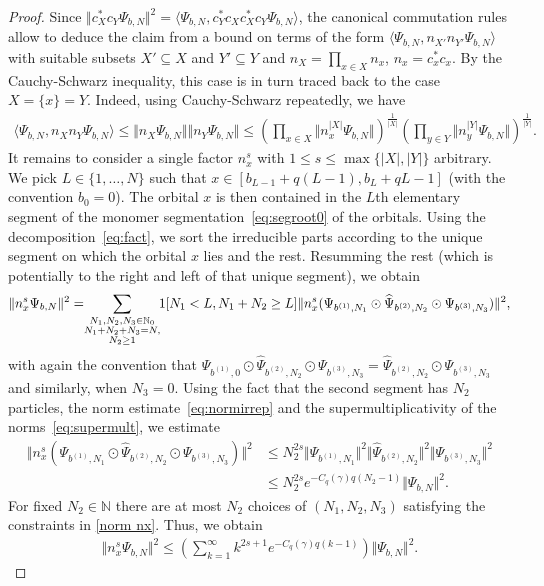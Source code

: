 \documentclass[letterpaper, DIV=17]{scrartcl}
\numberwithin{equation}{section}
\theoremstyle{definition}
\begin{document}
\begin{proof}
	Since $ \Vert c_X^* c_Y \Psi_{b,N} \Vert^2 = \langle    \Psi_{b,N}  , c_Y^* c_X c_X^* c_Y  \Psi_{b,N}  \rangle $, the canonical commutation rules allow to deduce the claim from a bound on terms of the form $  \langle    \Psi_{b,N}  , n_{X'} n_{Y'}  \Psi_{b,N}  \rangle $ with suitable subsets $ X' \subseteq X $ and $ Y' \subseteq Y $ and $ n_X = \prod_{x \in X } n_x $, $ n_x = c_x^* c_x $.
	By the Cauchy-Schwarz inequality,  this case is in turn traced back to the case  $X=\{x\}=Y$.  Indeed, using Cauchy-Schwarz repeatedly, we have 
	\begin{align*}
		 \langle    \Psi_{b,N}  , n_X n_Y  \Psi_{b,N}  \rangle  \leq \Vert n_X \Psi_{b,N}\Vert \Vert n_Y \Psi_{b,N} \Vert
		\leq \left(\prod_{x\in X} \Vert n_x^{\vert X\vert} \Psi_{b,N} \Vert\right)^{\frac{1}{\vert X\vert}} \left(\prod_{y\in Y} \Vert n_y^{\vert Y\vert} \Psi_{b,N} \Vert\right)^{\frac{1}{\vert Y\vert}}. 
	\end{align*}
	It remains to consider a single factor $n_x^s$ with $ 1\leq s \leq \max\{ | X | , |Y| \} $ arbitrary. We pick $L\in \{1, \dots, N\}$ such that $x\in [b_{L-1}+q(L-1), b_L+qL-1]$ (with the convention $b_0=0$). The orbital $x$ is then contained in the $L$th elementary segment of the monomer segmentation~\eqref{eq:segroot0} of the orbitals. Using the decomposition~\eqref{eq:fact}, we sort the irreducible parts  according to the unique segment on which the orbital $x$  lies and the rest. Resumming the rest (which is potentially to the right and left of that unique segment),  we obtain
	\begin{equation} \label{norm nx}
		\Vert n_x^s \Psi_{b,N} \Vert^2
		= \mkern-5mu \sum_{\substack{N_1, N_2, N_3\in \mathbb{N}_0\\ N_1+N_2+N_3=N, \\ N_2\geq 1}} \mkern-5mu 1[N_1<L, N_1+N_2\geq L] \Vert n_x^s (\Psi_{b^{(1)},N_1} \odot \widehat{\Psi}_{b^{(2)}, N_2} \odot \Psi_{b^{(3)},N_3}) \Vert^2,
	\end{equation}
	with again the convention that $ \Psi_{b^{(1)},0} \odot \widehat{\Psi}_{b^{(2)}, N_2} \odot \Psi_{b^{(3)},N_3} =  \widehat{\Psi}_{b^{(2)}, N_2} \odot \Psi_{b^{(3)},N_3}$ and similarly, when $N_3=0$. 
	Using the fact that the second segment has $ N_2 $ particles, the norm estimate~\eqref{eq:normirrep} and the supermultiplicativity of the norms~\eqref{eq:supermult}, we estimate
	\begin{align*}
		\Vert n_x^s (\Psi_{b^{(1)},N_1} \odot \widehat{\Psi}_{b^{(2)}, N_2} \odot \Psi_{b^{(3)},N_3}) \Vert^2
		&\leq N_2^{2s} \Vert \Psi_{b^{(1)},N_1} \Vert^2  \Vert  \widehat{\Psi}_{b^{(2)}, N_2} \Vert^2  \Vert  \Psi_{b^{(3)},N_3} \Vert^2 \\
		&\leq N_2^{2s} e^{-C_q(\gamma)q (N_2-1)} \Vert \Psi_{b,N}\Vert^2 . 
	\end{align*}
	For fixed $N_2\in \mathbb{N}$ there are at most $N_2$ choices of $(N_1, N_2, N_3)$ satisfying the constraints in \eqref{norm nx}. Thus, we obtain
	\begin{align*}
		\Vert n_x^s \Psi_{b,N} \Vert^2 \leq \left(\sum_{k=1}^\infty k^{2s+1} e^{-C_q(\gamma) q (k-1)}\right) \Vert \Psi_{b,N} \Vert^2.
	\end{align*}
	

\end{proof}
\end{document}

